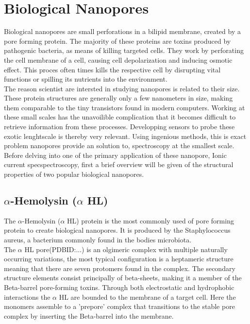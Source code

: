 \section{Biological Nanopores}

Biological nanopores are small perforations in a bilipid membrane, created
by a pore forming protein.  The majority of these proteins are toxins produced by
pathogenic bacteria, as means of killing targeted cells. They work by perforating the
cell membrane of a cell, causing cell depolarization and inducing osmotic effect. This
proces often times kills the respective cell by disrupting vital functions or spilling
its nutrients into the environment.\\

The reason scientist are intersted in studying nanopores is related to their size.
These protein structures are generally only a few nanometers in size, making them
comparable to the tiny transistors found in modern computers. Working at these small
scales has the unavoilible complication that it becomes difficult to retrieve information
from these processes. Developping sensors to probe these exotic lenghtscale is thereby
very relevant. Using ingenious methods, this is exact problem nanopores provide an
solution to, spectroscopy at the smallest scale.\\

Before delving into one of the primary application of these nanopore, Ionic current
specspectroscopy, first a brief overview will be given of the structural properties of
two popular biological nanopores.

\subsection{$\alpha$-Hemolysin ($\alpha$ HL)}

The $\alpha$-Hemolysin ($\alpha$ HL) protein is the most commonly used of pore forming
protein to create biological nanopores. It is produced by the Staphylococcus aureus, a
bacterium commonly found in the bodies microbiota.\\

The $\alpha$ HL pore(PDBID:...) is an olgimeric complex with multiple naturally occurring
variations, the most typical configuration
is a heptameric structure meaning that there are seven protomers found in the complex.
The secondary structure elements consist principally of beta-sheets, making it a member
of the Beta-barrel pore-forming toxins. Through both electrostatic and hydrophobic
interactions the $\alpha$ HL are bounded to the membrane of a target cell. Here the
monomers assemble to a 'prepore' complex that transitions to the stable pore complex by
inserting the Beta-barrel into the membrane.\\

